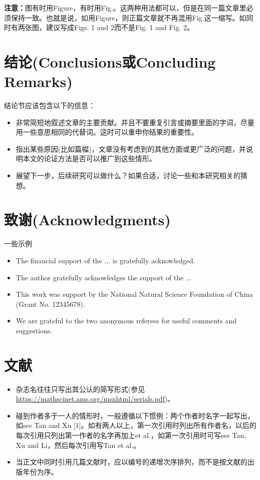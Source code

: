 \documentclass[11pt,final]{article}
\numberwithin{equation}{section}
\begin{document}
\textbf{注意：}图有时用Figure，有时用Fig.。这两种用法都可以，但是在同一篇文章里必须保持一致。也就是说，如用Figure，则正篇文章就不再混用Fig.这一缩写。如同时有两张图，建议写成Figs. 1 and 2而不是Fig. 1 and Fig. 2。

\section{结论(Conclusions或Concluding Remarks)}
结论节应该包含以下的信息：
\begin{itemize}
	\item 非常简短地叙述文章的主要贡献。并且不要重复引言或摘要里面的字词，尽量用一些意思相同的代替词。这时可以重申你结果的重要性。
	\item 指出某些原因(比如篇幅)，文章没有考虑到的其他方面或更广泛的问题，并说明本文的论证方法是否可以推广到这些情形。
	\item 展望下一步，后续研究可以做什么？如果合适，讨论一些和本研究相关的猜想。
\end{itemize}


\section{致谢(Acknowledgments)}
一些示例
\begin{itemize}
	\item The financial support of the ... is gratefully acknowledged.
	\item The author gratefully acknowledges the support of the ...
	\item This work was support by the National Natural Science Foundation of China (Grant No. 12345678).
	\item We are grateful to the two anonymous referees for useful comments and suggestions.
\end{itemize}

\section{文献}
\begin{itemize}
	\item 杂志名往往只写出其公认的简写形式(参见\url{https://mathscinet.ams.org/msnhtml/serials.pdf})。
	\item 碰到作者多于一人的情形时，一般遵循以下惯例：两个作者时名字一起写出，如see Tan and Xu [1]。如有两人以上，第一次引用时列出所有作者名，以后的每次引用只列出第一作者的名字再加上et al.，如第一次引用时可写see Tan, Xu and Li，然后每次引用写Tan et al.。
	\item 当正文中同时引用几篇文献时，应以编号的递增次序排列，而不是按文献的出版年份为序。
\end{itemize}
	
\end{document}
